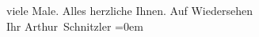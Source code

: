 \begin{ledgroupsized}[t]{13cm}
               viele Male. Alles herzliche Ihnen.\pend
           \pstart
           {\pb}Auf Wiedersehen
               {\\[\baselineskip]}Ihr \spacefill\mbox{Arthur Schnitzler}\pend
           \leftskip=0em{}          \endnumbering{}\end{ledgroupsized}  \newcommand{\dateiname}{L02601}\newcommand{\titel}{Arthur Schnitzler an Gertrud Rung, 2. 6. 1925}\newcommand{\editorInnen}{Martin Anton Müller und Laura Untner}
            \footnotesize
\begin{ledgroupsized}[t]{11.5cm}
\end{ledgroupsized}
         
      